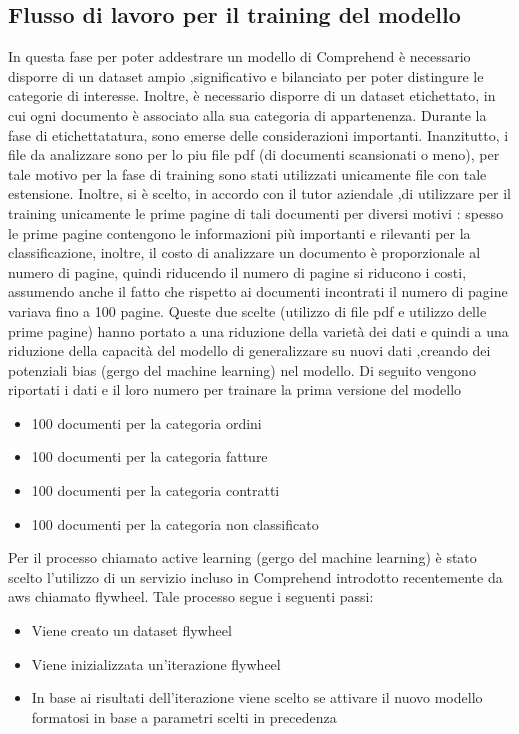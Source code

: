 \subsection{Flusso di lavoro per il training del modello}
\label{subsec:training-modello}
In questa fase per poter addestrare un modello di Comprehend è necessario disporre di un dataset ampio ,significativo e bilanciato per poter distingure le categorie di interesse. Inoltre, è necessario disporre di un dataset etichettato, in cui ogni documento è associato alla sua categoria di appartenenza. Durante la fase di etichettatatura, sono emerse delle considerazioni importanti. Inanzitutto, i file da analizzare sono per lo piu file pdf (di documenti scansionati o meno), per tale motivo per la fase di training sono stati utilizzati unicamente file con tale estensione. Inoltre, si è scelto, in accordo con il tutor aziendale ,di utilizzare per il training unicamente le prime pagine di tali documenti per diversi motivi : spesso le prime pagine contengono le informazioni più importanti e rilevanti per la classificazione, inoltre, il costo di analizzare un documento è proporzionale al numero di pagine, quindi riducendo il numero di pagine si riducono i costi, assumendo anche il fatto che rispetto ai documenti incontrati il numero di pagine variava fino a 100 pagine. Queste due scelte (utilizzo di file pdf e utilizzo delle prime pagine) hanno portato a una riduzione della varietà dei dati e quindi a una riduzione della capacità del modello di generalizzare su nuovi dati ,creando dei potenziali bias (gergo del machine learning) nel modello. Di seguito vengono riportati i dati e il loro numero per trainare la prima versione del modello
\begin{itemize}
    \item 100 documenti per la categoria ordini
    \item 100 documenti per la categoria fatture
    \item 100 documenti per la categoria contratti
    \item 100 documenti per la categoria non classificato
\end{itemize}
Per il processo chiamato active learning (gergo del machine learning) è stato scelto l'utilizzo di un servizio incluso in Comprehend introdotto recentemente da aws chiamato flywheel.
Tale processo segue i seguenti passi:
\begin{itemize}
    \item Viene creato un dataset flywheel
    \item Viene inizializzata un'iterazione flywheel
    \item In base ai risultati dell'iterazione viene scelto se attivare il nuovo modello formatosi in base a parametri scelti in precedenza
\end{itemize}
